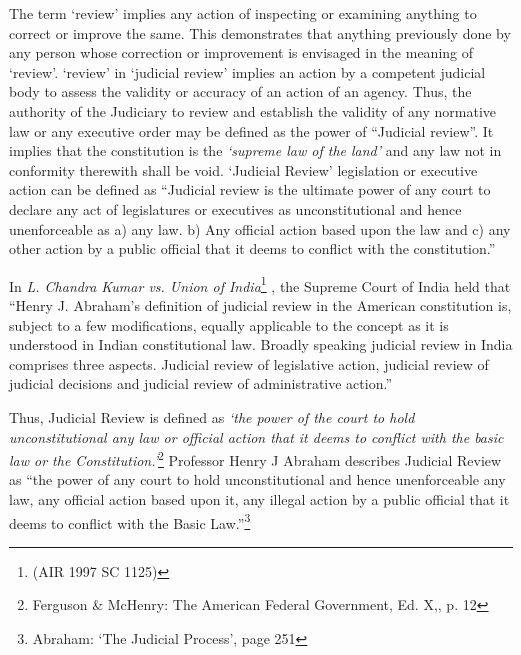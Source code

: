 \begin{multicols}{2}

\noi
The term ‘review’ implies any action of inspecting or examining anything to
correct or improve the same. This demonstrates that anything previously done by any
person whose correction or improvement is envisaged in the meaning of ‘review’.
‘review’ in ‘judicial review’ implies an action by a competent judicial body to assess
the validity or accuracy of an action of an agency. Thus, the authority of the Judiciary
to review and establish the validity of any normative law or any executive order may
be defined as the power of “Judicial review”. It implies that the constitution is the
\textit{‘supreme law of the land’} and any law not in conformity therewith shall be void.
‘Judicial Review’ legislation or executive action can be defined as “Judicial review is
the ultimate power of any court to declare any act of legislatures or executives as
unconstitutional and hence unenforceable as a) any law. b) Any official action based
upon the law and c) any other action by a public official that it deems to conflict with
the constitution.”

\noi
In \textit{L. Chandra Kumar vs. Union of India}\footnote{
(AIR 1997 SC 1125)}
, the Supreme Court of India held that
“Henry J. Abraham’s definition of judicial review in the American constitution is,
subject to a few modifications, equally applicable to the concept as it is understood in
Indian constitutional law. Broadly speaking judicial review in India comprises three aspects. Judicial review of legislative action, judicial review of judicial decisions and
judicial review of administrative action.”

\noi
Thus, Judicial Review is defined as \textit{‘the power of the court to hold
unconstitutional any law or official action that it deems to conflict with the basic law
or the Constitution.’}\footnote{Ferguson \& McHenry: The American Federal Government, Ed. X,, p. 12} Professor Henry J Abraham describes Judicial Review as “the
power of any court to hold unconstitutional and hence unenforceable any law, any
official action based upon it, any illegal action by a public official that it deems to
conflict with the Basic Law.”\footnote{ Abraham: ‘The Judicial Process’, page 251}



\end{multicols}
